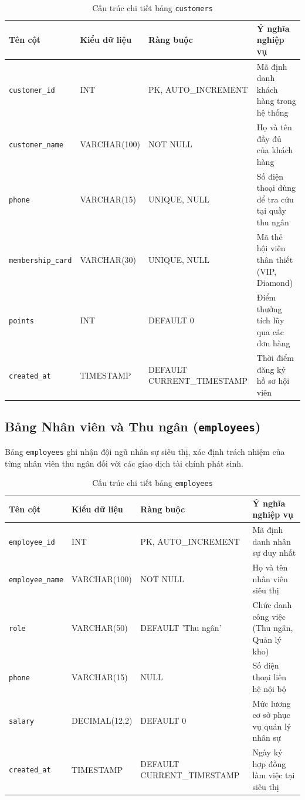 \documentclass[12pt,a4paper]{report}
\begin{document}
\begin{table}[H]
\centering
\footnotesize
\caption{Cấu trúc chi tiết bảng \texttt{customers}}
\label{tab:dict_customers}
\vspace{0.2cm}
\begin{tabularx}{\textwidth}{L{3.3cm} L{2.9cm} L{3.6cm} Y}
\toprule
\textbf{Tên cột} & \textbf{Kiểu dữ liệu} & \textbf{Ràng buộc} & \textbf{Ý nghĩa nghiệp vụ} \\
\midrule
\texttt{customer\_id} & INT & PK, AUTO\_INCREMENT & Mã định danh khách hàng trong hệ thống \\
\texttt{customer\_name} & VARCHAR(100) & NOT NULL & Họ và tên đầy đủ của khách hàng \\
\texttt{phone} & VARCHAR(15) & UNIQUE, NULL & Số điện thoại dùng để tra cứu tại quầy thu ngân \\
\texttt{membership\_card} & VARCHAR(30) & UNIQUE, NULL & Mã thẻ hội viên thân thiết (VIP, Diamond) \\
\texttt{points} & INT & DEFAULT 0 & Điểm thưởng tích lũy qua các đơn hàng \\
\texttt{created\_at} & TIMESTAMP & DEFAULT CURRENT\_TIMESTAMP & Thời điểm đăng ký hồ sơ hội viên \\
\bottomrule
\end{tabularx}
\end{table}

\newpage
\subsection{Bảng Nhân viên và Thu ngân (\texttt{employees})}
Bảng \texttt{employees} ghi nhận đội ngũ nhân sự siêu thị, xác định trách nhiệm của từng nhân viên thu ngân đối với các giao dịch tài chính phát sinh.

\begin{table}[H]
\centering
\footnotesize
\caption{Cấu trúc chi tiết bảng \texttt{employees}}
\label{tab:dict_employees}
\vspace{0.2cm}
\begin{tabularx}{\textwidth}{L{3.3cm} L{2.9cm} L{3.6cm} Y}
\toprule
\textbf{Tên cột} & \textbf{Kiểu dữ liệu} & \textbf{Ràng buộc} & \textbf{Ý nghĩa nghiệp vụ} \\
\midrule
\texttt{employee\_id} & INT & PK, AUTO\_INCREMENT & Mã định danh nhân sự duy nhất \\
\texttt{employee\_name} & VARCHAR(100) & NOT NULL & Họ và tên nhân viên siêu thị \\
\texttt{role} & VARCHAR(50) & DEFAULT 'Thu ngân' & Chức danh công việc (Thu ngân, Quản lý kho) \\
\texttt{phone} & VARCHAR(15) & NULL & Số điện thoại liên hệ nội bộ \\
\texttt{salary} & DECIMAL(12,2) & DEFAULT 0 & Mức lương cơ sở phục vụ quản lý nhân sự \\
\texttt{created\_at} & TIMESTAMP & DEFAULT CURRENT\_TIMESTAMP & Ngày ký hợp đồng làm việc tại siêu thị \\
\bottomrule
\end{tabularx}
\end{table}
\end{document}
